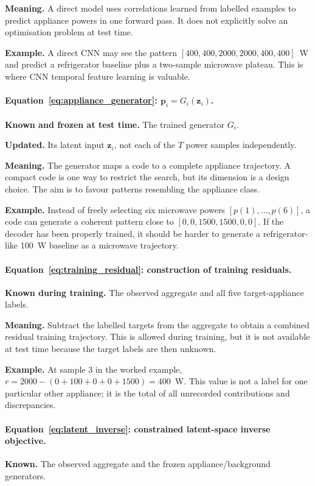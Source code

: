\documentclass[11pt]{article}
\newcommand{\vect}[1]{\mathbf{#1}}
\begin{document}
\textbf{Meaning.} A direct model uses correlations learned from labelled examples to predict appliance powers in one forward pass. It does not explicitly solve an optimisation problem at test time.

\textbf{Example.} A direct CNN may see the pattern $[400,400,2000,2000,400,400]$~W and predict a refrigerator baseline plus a two-sample microwave plateau. This is where CNN temporal feature learning is valuable.

\paragraph{Equation~\eqref{eq:appliance_generator}: $\vect{p}_i=G_i(\vect{z}_i)$.}
\textbf{Known and frozen at test time.} The trained generator $G_i$.

\textbf{Updated.} Its latent input $\vect{z}_i$, not each of the $T$ power samples independently.

\textbf{Meaning.} The generator maps a code to a complete appliance trajectory. A compact code is one way to restrict the search, but its dimension is a design choice. The aim is to favour patterns resembling the appliance class.

\textbf{Example.} Instead of freely selecting six microwave powers $[p(1),\ldots,p(6)]$, a code can generate a coherent pattern close to $[0,0,1500,1500,0,0]$. If the decoder has been properly trained, it should be harder to generate a refrigerator-like 100~W baseline as a microwave trajectory.

\paragraph{Equation~\eqref{eq:training_residual}: construction of training residuals.}
\textbf{Known during training.} The observed aggregate and all five target-appliance labels.

\textbf{Meaning.} Subtract the labelled targets from the aggregate to obtain a combined residual training trajectory. This is allowed during training, but it is not available at test time because the target labels are then unknown.

\textbf{Example.} At sample 3 in the worked example, $r=2000-(0+100+0+0+1500)=400$~W. This value is not a label for one particular other appliance; it is the total of all unrecorded contributions and discrepancies.

\paragraph{Equation~\eqref{eq:latent_inverse}: constrained latent-space inverse objective.}
\textbf{Known.} The observed aggregate and the frozen appliance/background generators.
\end{document}
